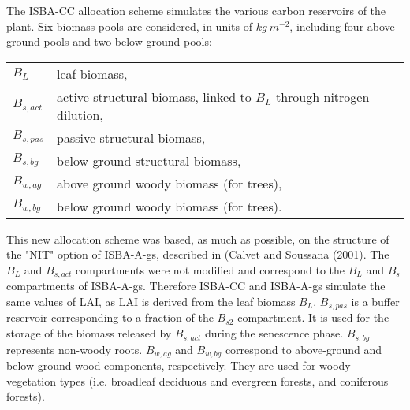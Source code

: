 {The ISBA-CC allocation scheme simulates the various carbon reservoirs of the plant. 
Six biomass pools are considered, in units of $kg \: m^{-2}$, 
including four above-ground pools and two below-ground pools:

\begin{tabular}{ll} %
$B_L$          & leaf biomass, \\
$B_{s,act}$    & active structural biomass,
                 linked to $B_L$ through nitrogen dilution, \\
$B_{s,pas}$    & passive structural biomass, \\
$B_{s,bg}$     & below ground structural biomass, \\
$B_{w,ag}$     & above ground woody biomass (for trees), \\
$B_{w,bg}$     & below ground woody biomass (for trees). \\
\end{tabular}


This new allocation scheme was based, as much as possible, on the structure of the "NIT" 
option of ISBA-A-gs, described in (Calvet and Soussana (2001).
The $B_L$ and $B_{s,act}$ compartments were not modified and 
correspond to the $B_L$ and $B_s$ compartments of ISBA-A-gs. 
Therefore ISBA-CC and ISBA-A-gs simulate the same values of LAI, as LAI is derived from 
the leaf biomass $B_L$.
$B_{s,pas}$ is a buffer reservoir corresponding to a fraction of the $B_{s2}$ compartment. 
It is used for the storage of the biomass released by $B_{s,act}$ 
during the senescence phase. 
$B_{s,bg}$ represents non-woody roots.
$B_{w,ag}$ and $B_{w,bg}$ correspond to above-ground and below-ground wood components, respectively. 
They are used for woody vegetation types (i.e. broadleaf deciduous and evergreen forests, and coniferous forests).

}
